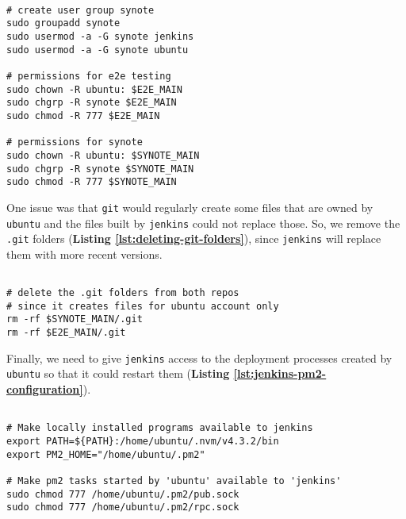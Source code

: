 \begin{listing}[H]
\begin{verbatim}

# create user group synote
sudo groupadd synote
sudo usermod -a -G synote jenkins
sudo usermod -a -G synote ubuntu

# permissions for e2e testing
sudo chown -R ubuntu: $E2E_MAIN
sudo chgrp -R synote $E2E_MAIN
sudo chmod -R 777 $E2E_MAIN

# permissions for synote
sudo chown -R ubuntu: $SYNOTE_MAIN
sudo chgrp -R synote $SYNOTE_MAIN
sudo chmod -R 777 $SYNOTE_MAIN

\end{verbatim}
\label{lst:deployment-folder-permissions}
\end{listing}

One issue was that \texttt{git} would regularly create some files that are owned by \texttt{ubuntu} and the files built by \texttt{jenkins} could not replace those. So, we remove the \texttt{.git} folders (\textbf{Listing \ref{lst:deleting-git-folders}}), since \texttt{jenkins} will replace them with more recent versions.\\

\begin{listing}[H]
\begin{verbatim}

# delete the .git folders from both repos
# since it creates files for ubuntu account only
rm -rf $SYNOTE_MAIN/.git
rm -rf $E2E_MAIN/.git

\end{verbatim}
\label{lst:deleting-git-folders}
\end{listing}

Finally, we need to give \texttt{jenkins} access to the deployment processes created by \texttt{ubuntu} so that it could restart them (\textbf{Listing \ref{lst:jenkins-pm2-configuration}}).\\

\begin{listing}[H]
\begin{verbatim}

# Make locally installed programs available to jenkins
export PATH=${PATH}:/home/ubuntu/.nvm/v4.3.2/bin
export PM2_HOME="/home/ubuntu/.pm2"

# Make pm2 tasks started by 'ubuntu' available to 'jenkins'
sudo chmod 777 /home/ubuntu/.pm2/pub.sock
sudo chmod 777 /home/ubuntu/.pm2/rpc.sock

\end{verbatim}
\label{lst:jenkins-pm2-configuration}
\end{listing}


